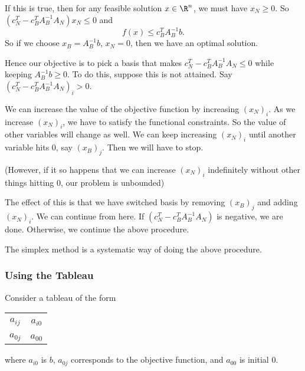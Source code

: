 \documentclass[a4paper]{article}
\begin{document}
If this is true, then for any feasible solution $x\in \R^n$, we must have $x_N \geq 0$. So $(c_N^T - c_B^TA_B^{-1}A_N)x_N \leq 0$ and
\[
  f(x) \leq c_B^T A_B^{-1}b.
\]
So if we choose $x_B = A_B^{-1}b$, $x_N = 0$, then we have an optimal solution.

Hence our objective is to pick a basis that makes $c_N^T - c_B^T A_B^{-1}A_N \leq 0$ while keeping $A_B^{-1}b \geq 0$. To do this, suppose this is not attained. Say $(c_N^T - c_B^T A_B^{-1}A_N)_i > 0$.

We can increase the value of the objective function by increasing $(x_N)_i$. As we increase $(x_N)_i$, we have to satisfy the functional constraints. So the value of other variables will change as well. We can keep increasing $(x_N)_i$ until another variable hits $0$, say $(x_B)_j$. Then we will have to stop.

(However, if it so happens that we can increase $(x_N)_i$ indefinitely without other things hitting $0$, our problem is unbounded)

The effect of this is that we have switched basis by removing $(x_B)_j$ and adding $(x_N)_i$. We can continue from here. If $(c_N^T - c_B^T A_B^{-1}A_N)$ is negative, we are done. Otherwise, we continue the above procedure.

The simplex method is a systematic way of doing the above procedure.

\subsubsection{Using the Tableau}
Consider a tableau of the form
\begin{center}
\begin{tabular}{cc}
  \toprule\\
  \quad\quad $a_{ij}$\quad\quad\quad & $a_{i0}$\\\\
  \midrule
  \quad\quad $a_{0j}$\quad\quad\quad & $a_{00}$\\
  \bottomrule
\end{tabular}
\end{center}
where $a_{i0}$ is $b$, $a_{0j}$ corresponds to the objective function, and $a_{00}$ is initial $0$.
\end{document}
